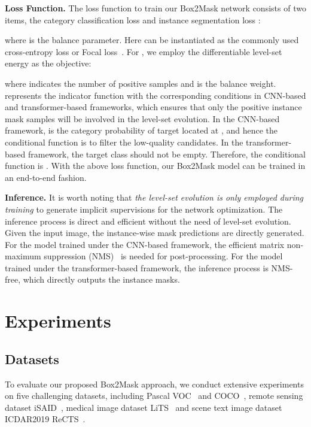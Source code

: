 \documentclass[12pt,onecolumn,letterpaper]{article}
\begin{document}
\textbf{Loss Function.} 
The loss function to train our Box2Mask network consists of two items, the category classification loss  and instance segmentation loss : 

where  is the balance parameter. Here  can be instantiated as the commonly used cross-entropy loss or Focal loss~\cite{lin2017focal}. 
For , we employ the differentiable level-set energy as the objective: 

where  indicates the number of positive samples and  is the balance weight.  represents the indicator function with the corresponding conditions in CNN-based and transformer-based frameworks, which ensures that only the positive instance mask samples will be involved in the level-set evolution.
In the CNN-based framework,   is the category probability of target located at , and hence the conditional function is  to filter the low-quality candidates.
In the transformer-based framework, the target class  should not be empty. Therefore, the conditional function is  . With the above loss function, our Box2Mask model can be trained in an end-to-end fashion.

\textbf{Inference.}
It is worth noting that \textit{the level-set evolution is only employed during training} to generate implicit supervisions for the network optimization. 
The inference process is direct and efficient without the need of level-set evolution.
Given the input image, the instance-wise mask predictions are directly generated. For the model trained under the CNN-based framework, the efficient matrix non-maximum suppression (NMS)~\cite{PMAI2021solo} is needed for post-processing. For the model trained under the transformer-based framework, the inference process is NMS-free, which directly outputs the instance masks.

\section{Experiments}



\subsection{Datasets}
To evaluate our proposed Box2Mask approach, we conduct extensive experiments on five challenging datasets, including Pascal VOC~\cite{pascalvoc2010} and COCO~\cite{lin2014microsoft}, remote sensing dataset iSAID~\cite{cvpr2019isaid}, medical image dataset LiTS~\cite{bilic2019lits} and scene text image dataset ICDAR2019 ReCTS~\cite{zhang2019icdar}.
\end{document}
